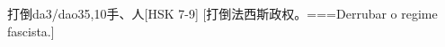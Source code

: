 \begin{EntryWithPhonetic}{打倒}{da3/dao3}{5,10}{⼿、⼈}[HSK 7-9]
  [打倒法西斯政权。===Derrubar o regime fascista.]
\end{EntryWithPhonetic}
